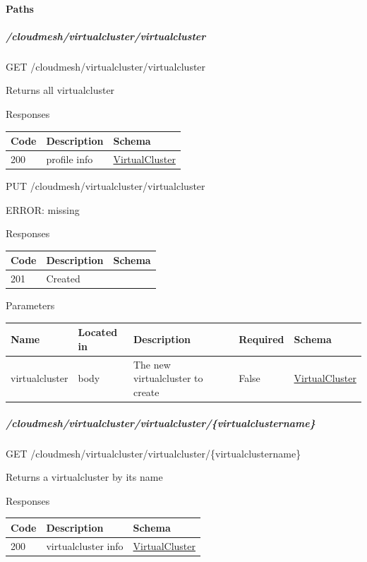 \documentclass[9pt,]{article}
\let\oldparagraph\paragraph
\renewcommand{\paragraph}[1]{\oldparagraph{#1}\mbox{}}
\let\oldsubparagraph\subparagraph
\renewcommand{\subparagraph}[1]{\oldsubparagraph{#1}\mbox{}}
\begin{document}
\hypertarget{paths-11}{%
\paragraph{Paths}\label{paths-11}}

\hypertarget{cloudmeshvirtualclustervirtualcluster}{%
\subparagraph{/cloudmesh/virtualcluster/virtualcluster}\label{cloudmeshvirtualclustervirtualcluster}}

GET /cloudmesh/virtualcluster/virtualcluster

Returns all virtualcluster

Responses

\begin{longtable}[]{@{}lll@{}}
\toprule
Code & Description & Schema\tabularnewline
\midrule
\endhead
200 & profile info &
\protect\hyperlink{virtualcluster}{VirtualCluster}\tabularnewline
\bottomrule
\end{longtable}

PUT /cloudmesh/virtualcluster/virtualcluster

ERROR: missing

Responses

\begin{longtable}[]{@{}lll@{}}
\toprule
Code & Description & Schema\tabularnewline
\midrule
\endhead
201 & Created &\tabularnewline
\bottomrule
\end{longtable}

Parameters

\begin{longtable}[]{@{}lllll@{}}
\toprule
Name & Located in & Description & Required & Schema\tabularnewline
\midrule
\endhead
virtualcluster & body & The new virtualcluster to create & False &
\protect\hyperlink{virtualcluster}{VirtualCluster}\tabularnewline
\bottomrule
\end{longtable}

\hypertarget{cloudmeshvirtualclustervirtualclustervirtualclustername}{%
\subparagraph{/cloudmesh/virtualcluster/virtualcluster/\{virtualclustername\}}\label{cloudmeshvirtualclustervirtualclustervirtualclustername}}

GET /cloudmesh/virtualcluster/virtualcluster/\{virtualclustername\}

Returns a virtualcluster by its name

Responses

\begin{longtable}[]{@{}lll@{}}
\toprule
Code & Description & Schema\tabularnewline
\midrule
\endhead
200 & virtualcluster info &
\protect\hyperlink{virtualcluster}{VirtualCluster}\tabularnewline
\bottomrule
\end{longtable}
\end{document}
